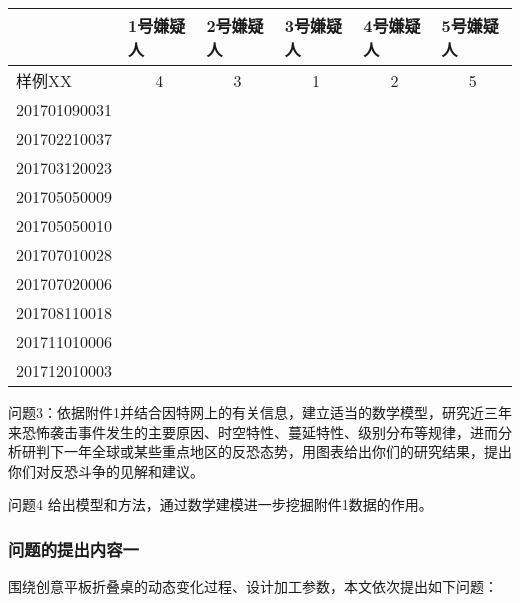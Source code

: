 \documentclass[bwprint]{gmcmthesis}
\begin{document}
\begin{table}[htbp]
	\centering
	\caption{}
	\begin{tabular}{|l|l|l|l|l|l|}
		\hline
		\multicolumn{1}{|p{4em}|}{ } & \multicolumn{1}{p{2em}|}{1号嫌疑人} & \multicolumn{1}{p{2em}|}{2号嫌疑人} & \multicolumn{1}{p{2em}|}{3号嫌疑人} & \multicolumn{1}{p{2em}|}{4号嫌疑人} & \multicolumn{1}{p{2em}|}{5号嫌疑人} \\
		\hline
		\multicolumn{1}{|p{4em}|}{样例XX} & \multicolumn{1}{c|}{4} & \multicolumn{1}{c|}{3} & \multicolumn{1}{c|}{1} & \multicolumn{1}{c|}{2} & \multicolumn{1}{c|}{5} \\
		\hline
		201701090031 &       &       &       &       &  \\
		\hline
		201702210037 &       &       &       &       &  \\
		\hline
		201703120023 &       &       &       &       &  \\
		\hline
		201705050009 &       &       &       &       &  \\
		\hline
		201705050010 &       &       &       &       &  \\
		\hline
		201707010028 &       &       &       &       &  \\
		\hline
		201707020006 &       &       &       &       &  \\
		\hline
		201708110018 &       &       &       &       &  \\
		\hline
		201711010006 &       &       &       &       &  \\
		\hline
		201712010003 &       &       &       &       &  \\
		\hline
	\end{tabular}%
	\label{tab:addlabel}%
\end{table}%

问题3：依据附件1并结合因特网上的有关信息，建立适当的数学模型，研究近三年来恐怖袭击事件发生的主要原因、时空特性、蔓延特性、级别分布等规律，进而分析研判下一年全球或某些重点地区的反恐态势，用图表给出你们的研究结果，提出你们对反恐斗争的见解和建议。

问题4 给出模型和方法，通过数学建模进一步挖掘附件1数据的作用。


\subsubsection{问题的提出内容一}

围绕创意平板折叠桌的动态变化过程、设计加工参数，本文依次提出如下问题：
\end{document}

